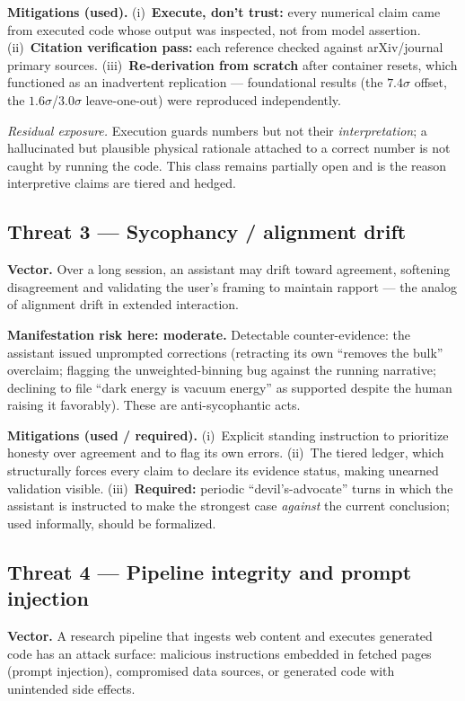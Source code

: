 \documentclass[11pt]{article}
\begin{document}
\textbf{Mitigations (used).} (i)~\textbf{Execute, don't trust:} every numerical claim came from executed code whose output was inspected, not from model assertion. (ii)~\textbf{Citation verification pass:} each reference checked against arXiv/journal primary sources. (iii)~\textbf{Re-derivation from scratch} after container resets, which functioned as an inadvertent replication --- foundational results (the $7.4\sigma$ offset, the $1.6\sigma$/$3.0\sigma$ leave-one-out) were reproduced independently.

\begin{caveatbox}
\textit{Residual exposure.} Execution guards numbers but not their \emph{interpretation}; a hallucinated but plausible physical rationale attached to a correct number is not caught by running the code. This class remains partially open and is the reason interpretive claims are tiered and hedged.
\end{caveatbox}

\subsection{Threat 3 --- Sycophancy / alignment drift}
\textbf{Vector.} Over a long session, an assistant may drift toward agreement, softening disagreement and validating the user's framing to maintain rapport --- the analog of alignment drift in extended interaction.

\textbf{Manifestation risk here: moderate.} Detectable counter-evidence: the assistant issued unprompted corrections (retracting its own ``removes the bulk'' overclaim; flagging the unweighted-binning bug against the running narrative; declining to file ``dark energy is vacuum energy'' as supported despite the human raising it favorably). These are anti-sycophantic acts.

\textbf{Mitigations (used / required).} (i)~Explicit standing instruction to prioritize honesty over agreement and to flag its own errors. (ii)~The tiered ledger, which structurally forces every claim to declare its evidence status, making unearned validation visible. (iii)~\textbf{Required:} periodic ``devil's-advocate'' turns in which the assistant is instructed to make the strongest case \emph{against} the current conclusion; used informally, should be formalized.

\subsection{Threat 4 --- Pipeline integrity and prompt injection}
\textbf{Vector.} A research pipeline that ingests web content and executes generated code has an attack surface: malicious instructions embedded in fetched pages (prompt injection), compromised data sources, or generated code with unintended side effects.
\end{document}
